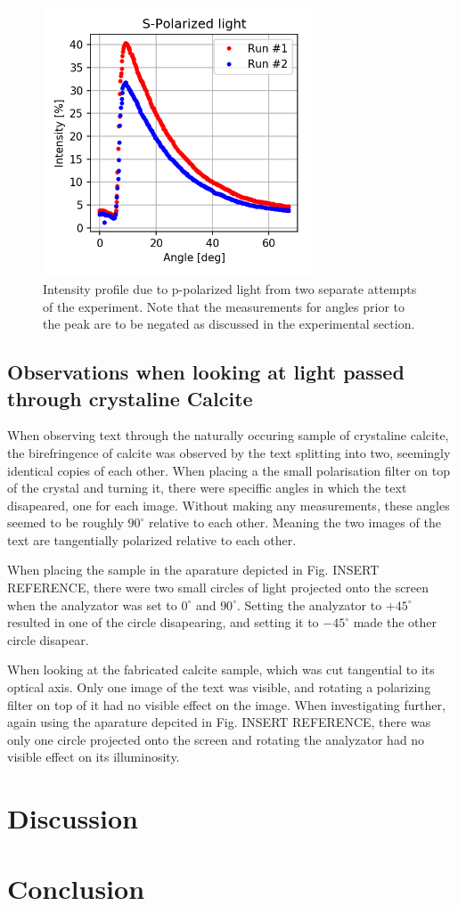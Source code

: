 \documentclass[11pt,a4paper,twocolumn]{article}
\begin{document}
  \begin{figure}[H]
    \center
    \includegraphics[width=8cm]{scripts/spolar.png}
    \caption{Intensity profile due to p-polarized light from two separate attempts of the experiment. Note that the measurements for angles prior to the peak are to be negated as discussed in the experimental section.}
  \end{figure}

  \subsection{Observations when looking at light passed through crystaline Calcite}
    When observing text through the naturally occuring sample of crystaline calcite, the birefringence of calcite was observed by the text splitting into two, seemingly identical copies of each other. When placing a the small polarisation filter on top of the crystal and turning it, there were speciffic angles in which the text disapeared, one for each image. Without making any measurements, these angles seemed to be roughly $90^\circ$ relative to each other. Meaning the two images of the text are tangentially polarized relative to each other. 

    When placing the sample in the aparature depicted in Fig. INSERT REFERENCE, there were two small circles of light projected onto the screen when the analyzator was set to $0^\circ$ and $90^\circ$.  Setting the analyzator to $+45^\circ$ resulted in one of the circle disapearing, and setting it to $-45^\circ$ made the other circle disapear.

    When looking at the fabricated calcite sample, which was cut tangential to its optical axis. Only one image of the text was visible, and rotating a polarizing filter on top of it had no visible effect on the image. When investigating further, again using the aparature depcited in Fig. INSERT REFERENCE, there was only one circle projected onto the screen and rotating the analyzator had no visible effect on its illuminosity. 

\section{\label{sect:discuss}Discussion}

\section{\label{sect:conclusion}Conclusion}

\onecolumn




\end{document}
